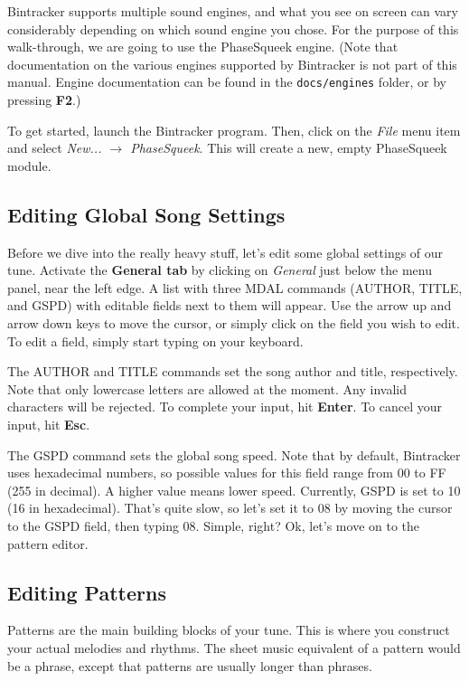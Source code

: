 \documentclass[12pt]{report}	%
\begin{document}
Bintracker supports multiple sound engines, and what you see on screen can vary considerably depending on which sound engine you chose. For the purpose of this walk-through, we are going to use the PhaseSqueek engine. (Note that documentation on the various engines supported by Bintracker is not part of this manual. Engine documentation can be found in the \texttt{docs/engines} folder, or by pressing \textbf{F2}.)

To get started, launch the Bintracker program. Then, click on the \textit{File} menu item and select \textit{New... $\rightarrow$ PhaseSqueek}. This will create a new, empty PhaseSqueek module.

\subsection{Editing Global Song Settings}
\label{subsec:editing-globals}

Before we dive into the really heavy stuff, let's edit some global settings of our tune. Activate the \textbf{General tab} by clicking on \textit{General} just below the menu panel, near the left edge. A list with three MDAL commands (AUTHOR, TITLE, and GSPD) with editable fields next to them will appear. Use the arrow up and arrow down keys to move the cursor, or simply click on the field you wish to edit. To edit a field, simply start typing on your keyboard. 

The AUTHOR and TITLE commands set the song author and title, respectively. Note that only lowercase letters are allowed at the moment. Any invalid characters will be rejected. To complete your input, hit \textbf{Enter}. To cancel your input, hit \textbf{Esc}.

The GSPD command sets the global song speed. Note that by default, Bintracker uses hexadecimal numbers, so possible values for this field range from 00 to FF (255 in decimal). A higher value means lower speed. Currently, GSPD is set to 10 (16 in hexadecimal). That's quite slow, so let's set it to 08 by moving the cursor to the GSPD field, then typing 08. Simple, right? Ok, let's move on to the pattern editor.

\subsection{Editing Patterns}
\label{subsec:editing-patterns}

Patterns are the main building blocks of your tune. This is where you construct your actual melodies and rhythms. The sheet music equivalent of a pattern would be a phrase, except that patterns are usually longer than phrases.
\end{document}
